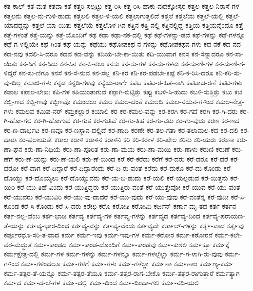ಕತ-ಕಾಲ್
ಕತ-ಮತ
ಕತವಾ
ಕತೆ
ಕತ್ತರಿ-ಸಲ್ಪಟ್ಟು
ಕತ್ತ-ರಿಸಿ
ಕತ್ತ-ರಿಸಿ-ಹಾಕು-ವುದಕ್ಕೋಸ್ಕರ
ಕತ್ತಲ
ಕತ್ತಲ-ನಿರಾಸೆ-ಗಳ
ಕತ್ತಲನು
ಕತ್ತಲ-ನು-ಗುಳಿ-ಹುದು
ಕತ್ತಲಲಿ
ಕತ್ತಲ-ಳಿ-ಯಲಿ
ಕತ್ತಲಾಗುತ್ತಲಿದೆ
ಕತ್ತಲೆ
ಕತ್ತಲೆಯ
ಕತ್ತಲೆ-ಯಲ್ಲಿ
ಕತ್ತಲೆ-ಯಾದದ್ದನ್ನು
ಕತ್ತಲೆ-ಯಾ-ಯಿತು
ಕತ್ತಲೆಯೆ
ಕತ್ತಲೊಳ-ಗಿನ
ಕತ್ತಿನ
ಕತ್ತಿ-ನಲ್ಲಿ
ಕತ್ತಿನಲ್ಲಿದ್ದ
ಕತ್ತಿಯ
ಕತ್ತಿಯನ್ನೆಂದೂ
ಕತ್ತೆ
ಕತ್ತೆ-ಗಳಂತೆ
ಕತ್ತೆ-ಯನ್ನು
ಕತ್ತೆ-ಯೊಂದಿಗೆ
ಕಥ
ಕಥಾ
ಕಥಾ-ನಕ-ದಲ್ಲಿ
ಕಥೆ
ಕಥೆ-ಗಳನ್ನಾ-ಡದೆ
ಕಥೆ-ಗಳನ್ನು
ಕಥೆ-ಗಳನ್ನೂ
ಕಥೆ-ಗ-ಳಲ್ಲಿಯೇ
ಕಥೆ-ಗಿಂತ
ಕಥೆ-ಯನ್ನು
ಕಥೆಯು
ಕಥೋಪಕಥ-ನ-ಗಳನ್ನು
ಕಥೋಪಕಥನ-ಗಳು
ಕದ-ನಕೆ
ಕದ-ನದ
ಕದ-ನವು
ಕದಲಿ-ಸಿ-ದರೂ
ಕದವ
ಕದ-ವನ್ನು
ಕದಿಯ-ಬೇ-ಕಾ-ಯಿತು
ಕದಿ-ಯುವಾಗ
ಕನಸ
ಕನ-ಸನ್ನಾದರೂ
ಕನ-ಸಾ-ಯಿತು
ಕನ-ಸಿಗೆ
ಕನ-ಸಿದು
ಕನ-ಸಿನ
ಕನ-ಸಿ-ನಲು
ಕನಸು
ಕನ-ಸು-ಗಳ
ಕನ-ಸು-ಗಳನು
ಕನ-ಸು-ಣಿ-ಗಳ
ಕನ-ಸು-ಣಿ-ಗ-ಳಿದ್ದರೆ
ಕನ-ಸು-ಣಿಗೂ
ಕನಸೆ
ಕನ-ಸೆ-ನುವ
ಕನ-ಸೆಲ್ಲ
ಕನಿ-ಕರ
ಕನಿ-ಕರ-ಪಡಬೇ-ಕಷ್ಟೆ
ಕನಿ-ಕ-ರಿಸಿ-ದರೂ
ಕನಿ-ಕರಿ-ಸು-ವು-ದಿಲ್ಲ
ಕನೂಜಿ-ಗಳು
ಕನ್ನಡ
ಕನ್ನಡಿ-ಗಳಿವು
ಕನ್ಯೆಯ-ರಾಗೇ
ಕಪಟ
ಕಪಟ-ರ-ಹಿತ-ನಾಗಿ
ಕಪಟಾಚ-ರಣೆ
ಕಪಟಿ-ಗಳು
ಕಪಾಲ
ಕಪಾಲ-ಲೇಖಃ
ಕಪಿ-ಗಳ
ಕಪಿಯಂತಾಗುವೆ
ಕಪ್ಪಾಗಿ-ಬಿಟ್ಟಿತ್ತು
ಕಪ್ಪು
ಕಬಳಿ-ಸಿ-ಹುದು
ಕಬಳಿ-ಸುತ್ತಿತ್ತು
ಕಬು
ಕಬೆ
ಕಬ್ಬಿ-ಣದ
ಕಬ್ಬಿ-ಣವು
ಕಬ್ಬಿಣವೊ
ಕಮಂಡಲು
ಕಮಲ
ಕಮಲ-ದಂತೆ
ಕಮಲದಿ
ಕಮಲ-ನಯನ-ಗಳಿಂದ
ಕಮಲ-ನೇತ್ರ-ಗಳು
ಕಮಲವ
ಕಮಿಷ-ನರ್
ಕಮ್ರಕಲ್ಹಾರ
ಕಯಾಲಿ
ಕರ
ಕರ-ಕಮಲ-ವನ್ನು
ಕರ-ಕರಗಿ
ಕರ-ಗದೆ
ಕರಗಿ
ಕರ-ಗಿ-ದರು
ಕರ-ಗಿ-ಹೋ-ಗಲಿ
ಕರ-ಗಿ-ಹೋಗುವ
ಕರ-ಗುತ
ಕರ-ಗುತಿವೆ
ಕರ-ಗು-ತಿಹ
ಕರ-ಗು-ವರು
ಕರ-ಗು-ವುದು
ಕರಣ
ಕರ-ಣದ
ಕರ-ಣ-ದಾರ್ಭಟ
ಕರ-ಣವೂ
ಕರ-ಣಸ್ಥಾನ-ದಲ್ಲಿದೆ
ಕರ-ಣಾದಿ
ಕರಣೇ
ಕರ-ತಲ-ಗತಾ
ಕರ-ತಲಾಮಲ-ಕದ
ಕರ-ದಲಿ
ಕರ-ಧಾರಾ
ಕರ-ಫಲಾಯತೇ
ಕರಾಲ
ಕರಾಳಿ
ಕರಾಳಿನ
ಕರಾಳಿನಿ
ಕರಿ
ಕರಿ-ಕರಾಳ
ಕರಿ-ಖೇಲ
ಕರಿನು
ಕರಿ-ಯರು
ಕರುಣಾ
ಕರು-ಣಾ-ಘನ
ಕರು-ಣಾ-ನಿಧಿಯೆ
ಕರು-ಣಾ-ಪೂರಿತ
ಕರು-ಣಾ-ಮಯ
ಕರು-ಣಾ-ಮಯಿ
ಕರು-ಣಾಳು
ಕರುಣಿ
ಕರುಣೆ
ಕರು-ಣೆಗೆ
ಕರು-ಣೆ-ಯನ್ನು
ಕರು-ಣೆ-ಯಲಿ
ಕರು-ಣೆ-ಯಿಂದ
ಕರೆ
ಕರೆ-ಕರೆದು
ಕರೆಗೆ
ಕರೆ-ದರು
ಕರೆ-ದರೂ
ಕರೆ-ದರೆ
ಕರೆ-ದರೋ
ಕರೆ-ದಾಗ
ಕರೆ-ದಿದ್ದಾರೆ
ಕರೆ-ದಿದ್ದಾರೆಂದು
ಕರೆ-ದಿ-ರು-ವಂತೆ
ಕರೆದು
ಕರೆ-ದುಕೊ
ಕರೆ-ದು-ಕೊಂಡು
ಕರೆ-ದೊಯ್ದು
ಕರೆ-ದೊಯ್ಯಲು
ಕರೆ-ದೊಯ್ಯುವನು
ಕರೆ-ಯ-ಬ-ಹುದು
ಕರೆ-ಯಲಿ
ಕರೆ-ಯಲ್ಪಡುವ
ಕರೆ-ಯಿತ್ತನು
ಕರೆ-ಯಿರಿ
ಕರೆ-ಯು-ತಿಹೆ-ವಿಂದು
ಕರೆ-ಯುತ್ತಿದ್ದರು
ಕರೆ-ಯುತ್ತಿರು-ವಂತೆ
ಕರೆ-ಯುತ್ತೇವೋ
ಕರೆ-ಯುವ
ಕರೆ-ಯು-ವಂತೆ
ಕರೆ-ಯುವರು
ಕರೆ-ಯುವಿರಿ
ಕರೆ-ಯು-ವು-ದಾದರೆ
ಕರೆ-ಯು-ವುದು
ಕರೆ-ಯು-ವುವು
ಕರೆ-ವಂತೆನ್ನ
ಕರೆ-ವುದೀ
ಕರೆ-ಸಿ-ಕೊಂಡ
ಕರೆ-ಸಿ-ಕೊಂಡು
ಕರೆ-ಸಿ-ದರು
ಕರೇಛಿ
ಕರೊ
ಕರೋತಿ
ಕರೋಮಿ
ಕರ್ಜನ್
ಕರ್ಣಾ-ಮೃ-ತದ
ಕರ್ತ
ಕರ್ತನ
ಕರ್ತ-ನಲ್ಲ-ವೆಂಬ
ಕರ್ತ-ಭಾಜ
ಕರ್ತವ್ಯ
ಕರ್ತವ್ಯ-ಗಳ
ಕರ್ತವ್ಯ-ಗಳನ್ನು
ಕರ್ತವ್ಯದ
ಕರ್ತವ್ಯ-ದಿಂದ
ಕರ್ತವ್ಯ-ಪರಾಯಣ-ತೆ-ಯನ್ನು
ಕರ್ತವ್ಯ-ಭಾರ-ದಿಂದ
ಕರ್ತವ್ಯ-ವನ್ನು
ಕರ್ತವ್ಯ-ವೆಂದು
ಕರ್ತವ್ಯವೇ
ಕರ್ತಾಲ್‌-ಗಳನ್ನು
ಕರ್ತೃ-ವಾದ
ಕರ್ತೃವು
ಕರ್ಪೂರಧೂ-ಸರಿ-ತ-ವಾದ
ಕರ್ಮ
ಕರ್ಮ-ಇವು
ಕರ್ಮ-ಇವು-ಗಳ
ಕರ್ಮ-ಕಠೋರ
ಕರ್ಮ-ಕಠೋರನೆ
ಕರ್ಮ-ಕಲೇ-ವರ-ಮದ್ಭುತ
ಕರ್ಮ-ಕಾಂಡದ
ಕರ್ಮ-ಕಾಂಡ-ದೊಂದಿಗೆ
ಕರ್ಮ-ಕಾಂಡವು
ಕರ್ಮ-ಕುಶಲಿ
ಕರ್ಮಕ್ಕೂ
ಕರ್ಮಕ್ಕೆ
ಕರ್ಮಕ್ಷೇತ್ರ-ದಲ್ಲಿ
ಕರ್ಮ-ಗಳ
ಕರ್ಮ-ಗಳನ್ನು
ಕರ್ಮ-ಗಳನ್ನೂ
ಕರ್ಮ-ಗಳಲ್ಲೆಲ್ಲಾ
ಕರ್ಮ-ಗ-ಳಾಗಿ-ರು-ವುವು
ಕರ್ಮ-ಗಳಿಂದ
ಕರ್ಮ-ಗಳಿಂದಲೂ
ಕರ್ಮ-ಗಳಿಗೆ
ಕರ್ಮ-ಗಳು
ಕರ್ಮ-ಗಳೆಲ್ಲಾ
ಕರ್ಮಣಾ
ಕರ್ಮಣಾಂ
ಕರ್ಮಣ್ಯ-ಕರ್ಮ
ಕರ್ಮ-ತತ್ಪರ-ತೆ-ಯನ್ನೂ
ಕರ್ಮ-ತತ್ಪರ-ತೆಯೂ
ಕರ್ಮ-ತತ್ಪರ-ರಾಗ-ಬೇಕೊ
ಕರ್ಮ-ತತ್ಪರ-ರಾಗುತ್ತಾರೆ
ಕರ್ಮತ್ಯಾಗ
ಕರ್ಮದ
ಕರ್ಮ-ದ-ಲೆ-ಗಳ
ಕರ್ಮ-ದಲ್ಲಿ
ಕರ್ಮ-ದಿಂದ
ಕರ್ಮ-ದಿಂದಾ-ಗಲಿ
ಕರ್ಮ-ನದಿ-ಯಲಿ
